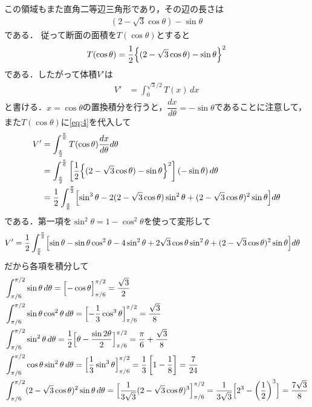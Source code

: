 \documentclass[../../main.tex]{subfiles}
\begin{document}
この領域もまた直角二等辺三角形であり，その辺の長さは
\begin{align}
  \left(2-\sqrt{3}\cos\theta\right) - \sin\theta
\end{align}
である．
従って断面の面積を$T(\cos\theta)$とすると
\begin{align}
  T(\cos\theta)=\dfrac{1}{2}\Bigl\{(2-\sqrt{3}\cos\theta)-\sin\theta \Bigr\}^2 \label{eq:4}
\end{align}
である．したがって体積$V'$は
\begin{align}
  V'
  &=\int_0^{\sqrt{3}/2}T(x)\,dx
\end{align}
と書ける．$x=\cos\theta$の置換積分を行うと，$\dfrac{dx}{d\theta}=-\sin\theta$であることに注意して，また$T(\cos\theta)$に\cref{eq:4}を代入して
\begin{align}
  V'
  &=\int_{\frac{\pi}{2}}^{\frac{\pi}{6}}T(\cos\theta)\dfrac{dx}{d\theta}d\theta \\
  &=\int_{\frac{\pi}{2}}^{\frac{\pi}{6}}\left[\dfrac{1}{2}\Bigl\{(2-\sqrt{3}\cos\theta)-\sin\theta \Bigr\}^2\right]\left(-\sin\theta\right) d\theta \\
  &=\dfrac{1}{2}\int_{\frac{\pi}{6}}^{\frac{\pi}{2}} \Bigl[\sin^3\theta -2(2-\sqrt{3}\cos\theta)\sin^2\theta + (2-\sqrt{3}\cos\theta)^2 \sin\theta \Bigr] d\theta
\end{align}
である．第一項を$\sin^2\theta=1-\cos^2\theta$を使って変形して
\begin{align}
  V'
  &=\dfrac{1}{2}\int_{\frac{\pi}{6}}^{\frac{\pi}{2}} \Bigl[\sin\theta -\sin\theta\cos^2\theta -4 \sin^2\theta + 2\sqrt{3}\cos\theta\sin^2\theta + (2-\sqrt{3}\cos\theta)^2\sin\theta \Bigr] d\theta \label{eq:5}
\end{align}
だから各項を積分して
\begin{align}
  & \int_{\pi/6}^{\pi/2}\sin\theta \,d\theta= \Bigl[-\cos\theta\Bigr]_{\pi/6}^{\pi/2} = \dfrac{\sqrt{3}}{2} \\
  & \int_{\pi/6}^{\pi/2}\sin\theta\cos^2\theta \,d\theta= \Bigl[-\dfrac{1}{3}\cos^3\theta\Bigr]_{\pi/6}^{\pi/2} = \dfrac{\sqrt{3}}{8} \\
  & \int_{\pi/6}^{\pi/2}\sin^2\theta \,d\theta= \dfrac{1}{2}\Bigl[\theta-\dfrac{\sin2\theta}{2}\Bigr]_{\pi/6}^{\pi/2} =  \dfrac{\pi}{6} + \dfrac{\sqrt{3}}{8} \\
  & \int_{\pi/6}^{\pi/2}\cos\theta\sin^2\theta \,d\theta= \Bigl[\dfrac{1}{3}\sin^3\theta\Bigr]_{\pi/6}^{\pi/2} = \dfrac{1}{3}\left[1-\dfrac{1}{8}\right] = \dfrac{7}{24}\\
  & \int_{\pi/6}^{\pi/2}(2-\sqrt{3}\cos\theta)^2\sin\theta \,d\theta= \Bigl[\dfrac{1}{3\sqrt{3}}(2-\sqrt{3}\cos\theta)^3\Bigr]_{\pi/6}^{\pi/2} = \dfrac{1}{3\sqrt{3}}\Bigl[2^3-\left(\dfrac{1}{2}\right)^3\Bigr] = \dfrac{7\sqrt{3}}{8}
\end{align}
\end{document}
